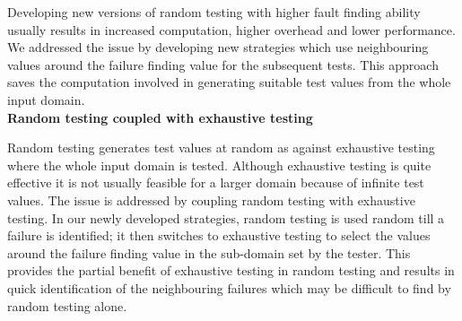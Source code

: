Developing new versions of random testing with higher fault finding ability usually results in increased computation, higher overhead and lower performance. We addressed the issue by developing new strategies which use neighbouring values around the failure finding value for the subsequent tests. This approach saves the computation involved in generating suitable test values from the whole input domain. \\

\textbf{Random testing coupled with exhaustive testing}

Random testing generates test values at random as against exhaustive testing where the whole input domain is tested. Although exhaustive testing is quite effective it is not usually feasible for a larger domain because of infinite test values. The issue is addressed by coupling random testing with exhaustive testing. In our newly developed strategies, random testing is used random till a failure is identified; it then switches to exhaustive testing to select the values around the failure finding value in the sub-domain set by the tester. This provides the partial benefit of exhaustive testing in random testing and results in quick identification of the neighbouring failures which may be difficult to find by random testing alone.\\







